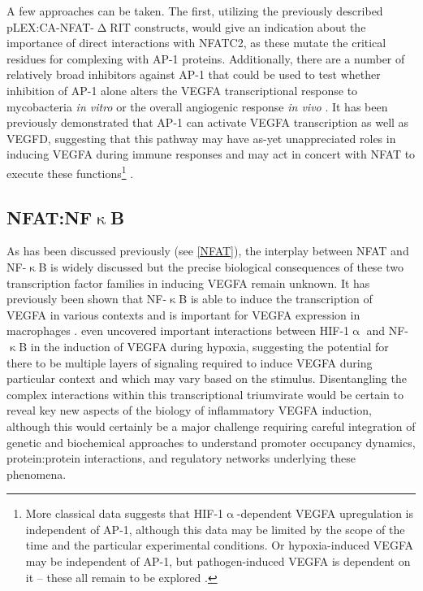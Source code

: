 A few approaches can be taken. The first, utilizing the previously described pLEX:CA\hyp{}NFAT\hyp{}$\upDelta$RIT constructs, would give an indication about the importance of direct interactions with NFATC2, as these mutate the critical residues for complexing with AP\hyp{}1 proteins. Additionally, there are a number of relatively broad inhibitors against AP\hyp{}1 that could be used to test whether inhibition of AP\hyp{}1 alone alters the VEGFA transcriptional response to mycobacteria \textit{in vitro} or the overall angiogenic response \textit{in vivo} \citep{Makino2017, Huang1997}. It has been previously demonstrated that AP\hyp{}1 can activate VEGFA transcription as well as VEGFD, suggesting that this pathway may have as\hyp{}yet unappreciated roles in inducing VEGFA during immune responses and may act in concert with NFAT to execute these functions\footnote{More classical data suggests that HIF\hyp{}1$\upalpha$\hyp{}dependent VEGFA upregulation is independent of AP\hyp{}1, although this data may be limited by the scope of the time and the particular experimental conditions. Or hypoxia\hyp{}induced VEGFA may be independent of AP\hyp{}1, but pathogen\hyp{}induced VEGFA is dependent on it -- these all remain to be explored \citep{Finkenzeller1995}.} \citep{Shih2001, Debinski2001, Wang2016, Josko2004, Guo2022}.

\subsection{NFAT:NF$\upkappa$B}\label{nfatnfkb}

As has been discussed previously (see \autoref{NFAT}), the interplay between NFAT and NF\hyp{}$\upkappa$B is widely discussed but the precise biological consequences of these two transcription factor families in inducing VEGFA remain unknown. It has previously been shown that NF\hyp{}$\upkappa$B is able to induce the transcription of VEGFA in various contexts \citep{Xie2010, Greenberger2010, Lukiw2003} and is important for VEGFA expression in macrophages \citep{Kiriakidis2003}. \citet{Lukiw2003} even uncovered important interactions between HIF\hyp{}1$\upalpha$ and NF\hyp{}$\upkappa$B in the induction of VEGFA during hypoxia, suggesting the potential for there to be multiple layers of signaling required to induce VEGFA during particular context and which may vary based on the stimulus. Disentangling the complex interactions within this transcriptional triumvirate would be certain to reveal key new aspects of the biology of inflammatory VEGFA induction, although this would certainly be a major challenge requiring careful integration of genetic and biochemical approaches to understand promoter occupancy dynamics, protein:protein interactions, and regulatory networks underlying these phenomena.

